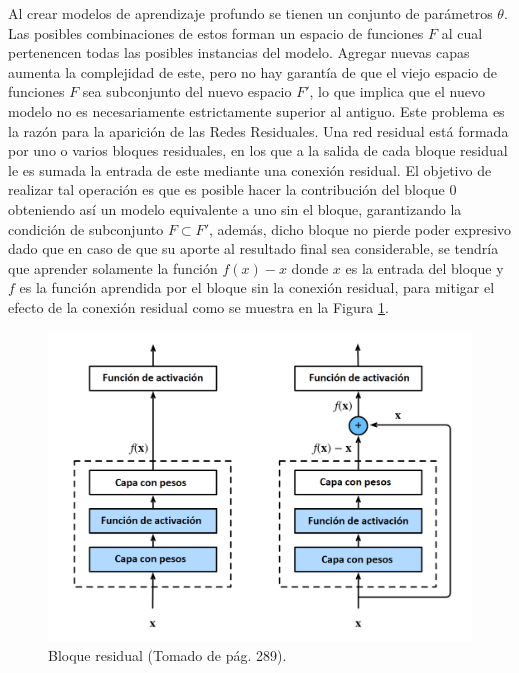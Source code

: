 Al crear modelos de aprendizaje profundo se tienen un conjunto de parámetros $\theta$. Las posibles combinaciones 
de estos forman un espacio de funciones $F$ al cual pertenencen todas las posibles instancias del modelo.
Agregar nuevas capas aumenta la complejidad de este, pero no hay garantía de que el viejo espacio 
de funciones $F$ sea subconjunto del nuevo espacio $F'$, lo que implica que el nuevo modelo no es necesariamente
estrictamente superior al antiguo. Este problema es la razón para la aparición de las Redes Residuales. 
Una red residual está formada por 
uno o varios bloques residuales, en los que a la salida de cada bloque residual le es sumada la entrada de 
este mediante una conexión residual.
El objetivo de realizar tal operación es que es posible hacer la contribución del bloque 0 obteniendo así
un modelo equivalente a uno sin el bloque, garantizando la condición de subconjunto $F \subset F'$, además,
dicho bloque no pierde poder expresivo dado que en caso de que su aporte al resultado final sea considerable, 
se tendría que aprender solamente la función $f(x) - x$ donde $x$ es la entrada del bloque y $f$ es la función 
aprendida por el bloque sin la conexión residual, para mitigar el efecto de la conexión residual como se muestra
en la Figura \ref{fig:res_block}.

\begin{figure}[h!]
	\begin{center}
		\begin{center}
			\includegraphics[scale=.3]{Graphics/resnet.png}
        \end{center}
	    \caption{Bloque residual (Tomado de \textcite{d2l} pág. 289).}\label{fig:res_block}
	\end{center}
\end{figure}

